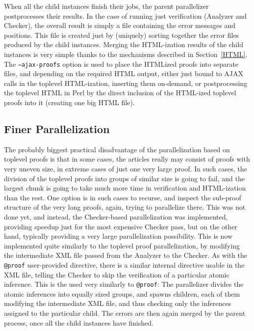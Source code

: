 \documentclass{llncs}
\begin{document}
\vspace{-1cm}
When all the child instances finish their jobs, the parent
parallelizer postprocesses their results. In the case of running just
verification (Analyzer and Checker), the overall result is simply a
file containing the error messages and positions. This file is created
just by (uniquely) sorting together the error files produced by the
child instances.  Merging the HTML-ization results of the child
instances is very simple thanks to the mechanisms described in
Section~\ref{HTML}.  The {\tt --ajax-proofs} option is used to place
the HTMLized proofs into separate files, and depending on the required
HTML output, either just bound to AJAX calls in the toplevel
HTML-ization, inserting them on-demand, or postprocessing the toplevel
HTML in Perl by the direct inclusion of the HTML-ized toplevel proofs
into it (creating one big HTML file).

\subsection{Finer Parallelization}
The probably biggest practical disadvantage of the parallelization
based on toplevel proofs is that in some cases, the articles really
may consist of proofs with very uneven size, in extreme cases of just
one very large proof.  In such cases, the division of the toplevel
proofs into groups of similar size is going to fail, and the largest
chunk is going to take much more time in verification and HTML-ization
than the rest. One option is in such cases to recurse, and inspect the
sub-proof structure of the very long proofs, again, trying to
parallelize there.  This was not done yet, and instead, the
Checker-based parallelization was implemented, providing speedup just
for the most expensive Checker pass, but on the other hand, typically
providing a very large parallelization possibility.  This is now
implemented quite similarly to the toplevel proof parallelization, by
modifying the intermediate XML file passed from the Analyzer to the
Checker. As with the {\tt @proof} user-provided directive, there is a
similar internal directive usable in the XML file, telling the Checker
to skip the verification of a particular atomic inference. This is the
used very similarly to {\tt @proof}: The parallelizer divides the
atomic inferences into equally sized groups, and spawns  children,
each of them modifying the intermediate XML file, and thus checking
only the inferences assigned to the particular child. The errors are
then again merged by the parent process, once all the child instances
have finished. 
\end{document}
